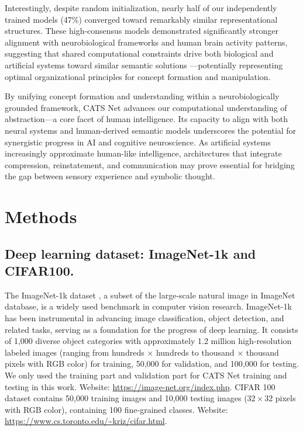 \documentclass[pdflatex,sn-mathphys-num,lineno]{sn-jnl}%
\begin{document}
\begin{CJK}{UTF8}{gbsn}
Interestingly, despite random initialization, nearly half of our independently trained models (47\%) converged toward remarkably similar representational structures. These high-consensus models demonstrated significantly stronger alignment with neurobiological frameworks and human brain activity patterns, suggesting that shared computational constraints drive both biological and artificial systems toward similar semantic solutions \cite{carandini_normalization_2012}—potentially representing optimal organizational principles for concept formation and manipulation.

By unifying concept formation and understanding within a neurobiologically grounded framework, CATS Net advances our computational understanding of abstraction—a core facet of human intelligence. Its capacity to align with both neural systems and human-derived semantic models underscores the potential for synergistic progress in AI and cognitive neuroscience. As artificial systems increasingly approximate human-like intelligence, architectures that integrate compression, reinstatement, and communication may prove essential for bridging the gap between sensory experience and symbolic thought.


\section{Methods}
\subsection{Deep learning dataset: ImageNet-1k and CIFAR100.} The ImageNet-1k dataset \cite{deng_imagenet_2009}, a subset of the large-scale natural image in ImageNet database, is a widely used benchmark in computer vision research. ImageNet-1k has been instrumental in advancing image classification, object detection, and related tasks, serving as a foundation for the progress of deep learning. It consists of 1,000 diverse object categories with approximately 1.2 million high-resolution labeled images (ranging from hundreds $\times$ hundreds to thousand $\times$ thousand pixels with RGB color) for training, 50,000 for validation, and 100,000 for testing. We only used the training part and validation part for CATS Net training and testing in this work. Website: \url{https://image-net.org/index.php}. CIFAR 100 dataset \cite{krizhevsky_learning_2009} contains 50,000 training images and 10,000 testing images ($32\times32$ pixels with RGB color), containing 100 fine-grained classes. Website: \url{https://www.cs.toronto.edu/~kriz/cifar.html}.


\end{CJK}
\end{document}
